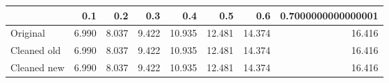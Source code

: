 \begin{tabular}{lrrrrrrr}
\toprule
{} &   0.1 &   0.2 &   0.3 &    0.4 &    0.5 &    0.6 & 0.7000000000000001 \\
\midrule
Original    & 6.990 & 8.037 & 9.422 & 10.935 & 12.481 & 14.374 &             16.416 \\
Cleaned old & 6.990 & 8.037 & 9.422 & 10.935 & 12.481 & 14.374 &             16.416 \\
Cleaned new & 6.990 & 8.037 & 9.422 & 10.935 & 12.481 & 14.374 &             16.416 \\
\bottomrule
\end{tabular}
